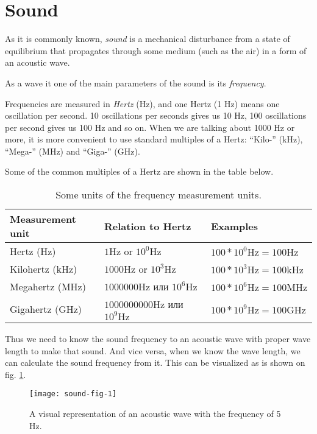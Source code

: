 \documentclass[../sparc.tex]{subfiles}
\begin{document}
\section{Sound}

As it is commonly known, \emph{sound} is a mechanical disturbance from a state
of equilibrium that propagates through some medium (such as the air) in a form
of an acoustic wave. \cite{britannica:sound}

As a wave it one of the main parameters of the sound is its \emph{frequency}.

Frequencies are measured in \emph{Hertz} (\gls{Hz}), and one Hertz (1 Hz) means
one oscillation per second.  10 oscillations per seconds gives us 10 Hz, 100
oscillations per second gives us 100 Hz and so on.  When we are talking about
1000 Hz or more, it is more convenient to use standard multiples of a Hertz:
``Kilo-'' (\gls{kHz}), ``Mega-'' (\gls{MHz}) and ``Giga-'' (\gls{GHz}).

Some of the common multiples of a Hertz are shown in the table below.

\begin{table}[h]
  \centering
  \begin{tabular}{p{3cm}|p{4cm}|p{3.5cm}}
    Measurement unit & Relation to Hertz & Examples \\
    \hline \hline
    Hertz (Hz)
    & $ 1 \mbox{Hz} $ or $ 10^0 \mbox{Hz} $
    & $ 100 * 10^0 \mbox{Hz} = 100 \mbox{Hz} $ \\
    \hline
    Kilohertz (kHz)
    & $ 1000 \mbox{Hz} $ or $ 10^3 \mbox{Hz} $
    & $ 100 * 10^3 \mbox{Hz} = 100 \mbox{kHz} $ \\
    \hline
    Megahertz (MHz)
    & $ 1000000 \mbox{Hz} $ или $ 10^6 \mbox{Hz} $
    & $ 100 * 10^6 \mbox{Hz} = 100 \mbox{MHz} $ \\
    \hline
    Gigahertz (GHz)
    & $ 1000000000 \mbox{Hz} $ или $ 10^9 \mbox{Hz} $
    & $ 100 * 10^9 \mbox{Hz} = 100 \mbox{GHz} $ \\
  \end{tabular}
  \caption{Some units of the frequency measurement units.}
  \label{table:sound-hertz-scale}
\end{table}

Thus we need to know the sound frequency to an acoustic wave with proper wave
length to make that sound.  And vice versa, when we know the wave length, we can
calculate the sound frequency from it.  This can be visualized as is shown on
fig. \ref{fig:sound-fig-1}.

\begin{figure}[h]
  \centering
  \texttt{[image: sound-fig-1]}
  \caption{A visual representation of an acoustic wave with the frequency of 5
    Hz.}
  \label{fig:sound-fig-1}
\end{figure}
\end{document}
